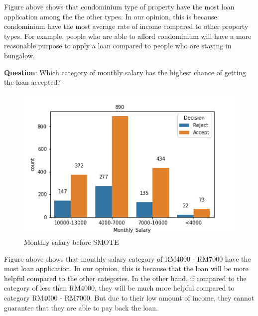 \documentclass[11pt]{article}
\begin{document}
Figure above shows that condominium type of property have the most loan application among the the other types. In our opinion, this is because condominium have the most average rate of income compared to other property types. For example, people who are able to afford condominium will have a more reasonable purpose to apply a loan compared to people who are staying in bungalow. 
\clearpage

\noindent \textbf{Question}: Which category of monthly salary has the highest chance of getting the loan accepted?
\begin{figure}[h]
\centerline{\includegraphics[scale=0.8]{bSMOTE_month_salary.png} }
\label{fig:bSmoteMonthSalary}
\caption{Monthly salary before SMOTE}
\end{figure}

Figure above shows that monthly salary category of RM4000 - RM7000 have the most loan application. In our opinion, this is because that the loan will be more helpful compared to the other categories. In the other hand, if compared to the category of less than RM4000, they will be much more helpful compared to category RM4000 - RM7000. But due to their low amount of income, they cannot guarantee that they are able to pay back the loan.
\clearpage
\end{document}
